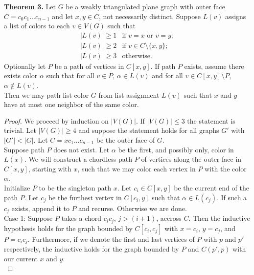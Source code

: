 \documentclass[12pt,a4paper]{article}
\begin{document}
\begin{adjustwidth}{2em}{2em}
\noindent \textbf{Theorem 3.} Let $G$ be a weakly triangulated plane graph with outer face $C=c_0c_1\ldots c_{n-1}$
and let $x,y\in C$, not necessarily distinct.
Suppose $L(v)$ assigns a list of colors to each $v\in V(G)$ such that
\[
    \begin{array}{ll}
	    |L(v)|\ge 1 & \text{if } v=x \text{ or } v=y;\\
	    |L(v)|\ge 2 & \text{if } v\in C\setminus\{x,y\};\\
	    |L(v)|\ge 3 & \text{otherwise.}
    \end{array}
\]
Optionally let $P$ be a path of vertices in $C[x,y]$. If path $P$ exists,
assume there exists color $\alpha$ such that for all $v\in P$, $\alpha\in L(v)$ and for all
$v\in C[x,y]\setminus P$, $\alpha\not\in L(v)$.\\

\noindent Then we may path list color $G$ from list assignment $L(v)$ such that $x$ and $y$ have at most
one neighbor of the same color.

\begin{proof}
We proceed by induction on $|V(G)|$. If $|V(G)|\le3$ the statement is trivial. Let $|V(G)|\ge4$ and suppose the
statement holds for all graphs $G'$ with $|G'|<|G|$. Let $C=xc_1\ldots c_{n-1}$ be the outer face of $G$.\\

\noindent Suppose path $P$ does not exist. Let $\alpha$ be the first, and possibly only, color in $L(x)$.
We will construct a
chordless path $P$ of vertices along the outer face in $C[x,y]$,
starting with $x$, such that we may color each vertex in $P$ with the color $\alpha$.\\

\noindent Initialize $P$ to be the singleton path $x$. Let $c_i\in C[x,y]$ be the current end of the path $P$.
Let $c_j$ be the furthest vertex in $C[c_i,y]$ such that $\alpha\in L(c_j)$. If such a $c_j$ exists, append it
to $P$ and recurse. Otherwise we are done.\\

\noindent Case 1: Suppose $P$ takes a chord $c_ic_j$,
$j>(i+1)$, accross $C$. Then the inductive hypothesis holds for the graph
bounded by $C[c_i,c_j]$ with $x=c_i$, $y=c_j$, and $P=c_ic_j$. Furthermore, if we denote the first and last
vertices of $P$ with $p$ and $p'$ respectively, the inductive holds for the graph bounded by $P$ and $C(p',p)$
with our current $x$ and $y$.\\


\end{proof}
\end{adjustwidth}
\end{document}
